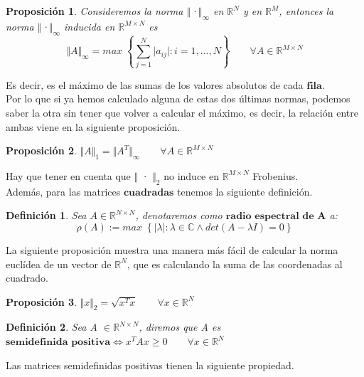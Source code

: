\documentclass[10pt, a4paper]{article}
\theoremstyle{theorem-style}
\newtheorem{nprop}{Proposición}[section]
\theoremstyle{definition-style}
\newtheorem{ndef}{Definición}[section]
\theoremstyle{remark-style}
\theoremstyle{example-style}
\theoremstyle{definition-style}
\theoremstyle{remark-style}
\begin{document}
\begin{nprop}
Consideremos la norma $\Vert$·$\Vert _\infty$ en $\mathbb{R}^N$ y en $\mathbb{R}^M$, entonces la norma $\Vert$·$\Vert _\infty$ inducida en $\mathbb{R}^{M \times N}$ es
\[ \Vert A \Vert _\infty = max \; \left\lbrace \sum_{j=1}^N \vert a_{ij} \vert : i = 1,...,N \right\rbrace \qquad \forall A \in \mathbb{R}^{M \times N} \]
\end{nprop}

Es decir, es el máximo de las sumas de los valores absolutos de cada $\textbf{fila}$.\\

Por lo que si ya hemos calculado alguna de estas dos últimas normas, podemos saber la otra sin tener que volver a calcular el máximo, es decir, la relación entre ambas viene en la siguiente proposición.

\begin{nprop}
$\Vert A \Vert _1 = \Vert A^T \Vert _\infty \qquad \forall A \in \mathbb{R}^{M \times N}$
\end{nprop}

Hay que tener en cuenta que $\Vert$ · $\Vert _2$ no induce en $\mathbb{R}^{M \times N}$ Frobenius.\\

Además, para las matrices $\textbf{cuadradas}$ tenemos la siguiente definición.

\begin{ndef}
Sea $A \in \mathbb{R}^{N \times N}$, denotaremos como $\textbf{radio espectral de A}$ a:
\[ \rho (A) := max \; \left\lbrace \vert \lambda \vert : \lambda \in \mathbb{C} \wedge det(A - \lambda I) = 0 \right\rbrace \]
\end{ndef}

La siguiente proposición muestra una manera más fácil de calcular la norma euclídea de un vector de $\mathbb{R}^N$, que es calculando la suma de las coordenadas al cuadrado.

\begin{nprop}
$\Vert x \Vert _2 = \sqrt{x^Tx} \qquad \forall x \in \mathbb{R}^N$
\end{nprop}

\begin{ndef}
Sea A $\in \mathbb{R}^{N \times N}$, diremos que A es $\textbf{semidefinida positiva} \Leftrightarrow x^TAx \geq 0 \qquad \forall x \in \mathbb{R}^N $
\end{ndef}

Las matrices semidefinidas positivas tienen la siguiente propiedad.
\end{document}

